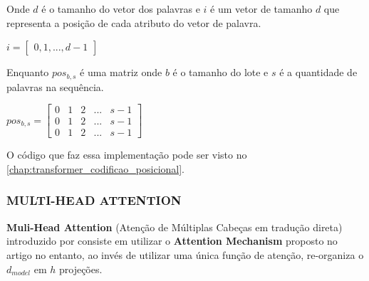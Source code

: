 Onde $d$ é o tamanho do vetor dos palavras e $i$ é um vetor de tamanho $d$ que representa a posição de cada atributo do vetor de palavra.

\begin{center}
    $i = \begin{bmatrix} 0, 1, ..., d-1 \end{bmatrix}$
\end{center}

Enquanto $pos_{b,s}$ é uma matriz onde $b$ é o tamanho do lote e $s$ é a quantidade de palavras na sequência.

\begin{center}
    $pos_{b, s} = \begin{bmatrix}
    0 & 1 & 2 & ... & s-1 \\
    0 & 1 & 2 & ... & s-1 \\
    0 & 1 & 2 & ... & s-1
    \end{bmatrix}$
\end{center}

O código que faz essa implementação pode ser visto no \autoref{chap:transformer_codificao_posicional}.








\subsubsection{MULTI-HEAD ATTENTION}

\textbf{Muli-Head Attention} (Atenção de Múltiplas Cabeças em tradução direta) introduzido por \cite{transformer} consiste em utilizar o \textbf{Attention Mechanism} proposto no artigo \cite{attention} no entanto, ao invés de utilizar uma única função de atenção, re-organiza o $d_{model}$ em $h$ projeções.




